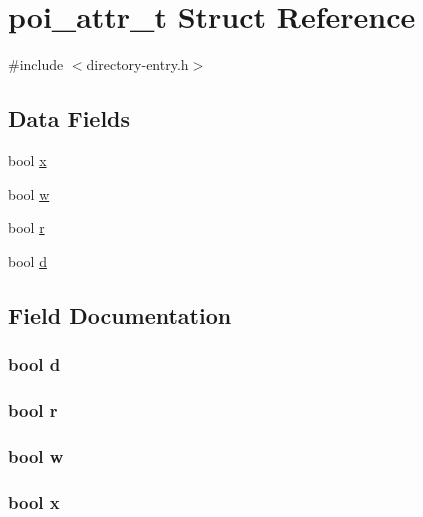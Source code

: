 \hypertarget{structpoi__attr__t}{\section{poi\-\_\-attr\-\_\-t Struct Reference}
\label{structpoi__attr__t}
}


{\ttfamily \#include $<$directory-\/entry.\-h$>$}

\subsection*{Data Fields}
\begin{DoxyCompactItemize}
\item 
bool \hyperlink{structpoi__attr__t_a946a8f8377210c472c7cbdf11f154280}{x}
\item 
bool \hyperlink{structpoi__attr__t_ac2e5f3b10af22c39ed83be143a508b80}{w}
\item 
bool \hyperlink{structpoi__attr__t_a904fc9328a7095487716875e4a892851}{r}
\item 
bool \hyperlink{structpoi__attr__t_a291ac6e121c27d3c9a71d995cf34685c}{d}
\end{DoxyCompactItemize}


\subsection{Field Documentation}
\hypertarget{structpoi__attr__t_a291ac6e121c27d3c9a71d995cf34685c}{
\subsubsection[{d}]{\setlength{\rightskip}{0pt plus 5cm}bool d}}\label{structpoi__attr__t_a291ac6e121c27d3c9a71d995cf34685c}
\hypertarget{structpoi__attr__t_a904fc9328a7095487716875e4a892851}{
\subsubsection[{r}]{\setlength{\rightskip}{0pt plus 5cm}bool r}}\label{structpoi__attr__t_a904fc9328a7095487716875e4a892851}
\hypertarget{structpoi__attr__t_ac2e5f3b10af22c39ed83be143a508b80}{
\subsubsection[{w}]{\setlength{\rightskip}{0pt plus 5cm}bool w}}\label{structpoi__attr__t_ac2e5f3b10af22c39ed83be143a508b80}
\hypertarget{structpoi__attr__t_a946a8f8377210c472c7cbdf11f154280}{
\subsubsection[{x}]{\setlength{\rightskip}{0pt plus 5cm}bool x}}\label{structpoi__attr__t_a946a8f8377210c472c7cbdf11f154280}


